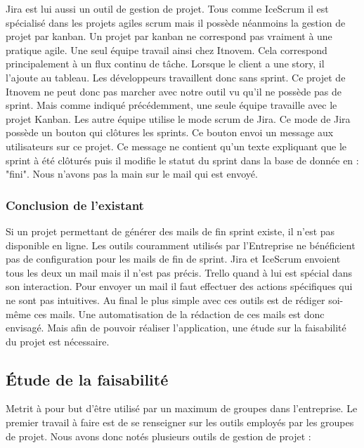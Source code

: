 \documentclass[12pt, twoside, openright]{report}
\begin{document}
Jira est lui aussi un outil de gestion de projet. Tous comme IceScrum il est spécialisé dans les projets agiles scrum mais il possède néanmoins la gestion de projet par kanban. Un projet par kanban ne correspond pas vraiment à une pratique agile. Une seul équipe travail ainsi chez Itnovem. Cela correspond principalement à un flux continu de tâche. Lorsque le client a une story, il l'ajoute au tableau. Les développeurs travaillent donc sans sprint. Ce projet de Itnovem ne peut donc pas marcher avec notre outil vu qu'il ne possède pas de sprint.
Mais comme indiqué précédemment, une seule équipe travaille avec le projet Kanban. Les autre équipe utilise le mode scrum de Jira. Ce mode de Jira possède un bouton qui clôtures les sprints. Ce bouton envoi un message aux utilisateurs sur ce projet. Ce message ne contient qu'un texte expliquant que le sprint à été clôturés puis il modifie le statut du sprint dans la base de donnée en : "fini". Nous n'avons pas la main sur le mail qui est envoyé. 

\subsubsection{Conclusion de l'existant}
Si un projet permettant de générer des mails de fin sprint existe, il n'est pas disponible en ligne. Les outils couramment utilisés par l'Entreprise ne bénéficient pas de configuration pour les mails de fin de sprint. Jira et IceScrum envoient tous les deux un mail mais il n'est pas précis. Trello quand à lui est spécial dans son interaction. Pour envoyer un mail il faut effectuer des actions spécifiques qui ne sont pas intuitives. Au final le plus simple avec ces outils est de rédiger soi-même ces mails. Une automatisation de la rédaction de ces mails est donc envisagé. Mais afin de pouvoir réaliser l'application, une étude sur la faisabilité du projet est nécessaire. 

\subsection{Étude de la faisabilité}

Metrit à pour but d'être utilisé par un maximum de groupes dans l'entreprise. Le premier travail à faire est de se renseigner sur les outils employés par les groupes de projet. Nous avons donc notés plusieurs outils de gestion de projet :
\end{document}
